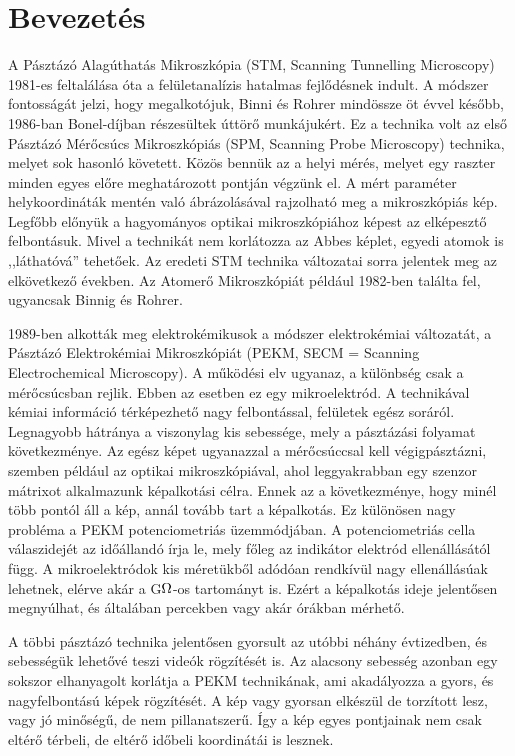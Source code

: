 \section{Bevezetés}
A Pásztázó Alagúthatás Mikroszkópia (STM, Scanning Tunnelling Microscopy) 1981-es feltalálása óta a felületanalízis hatalmas fejlődésnek indult.
A módszer fontosságát jelzi, hogy megalkotójuk, Binni és Rohrer mindössze öt évvel később, 1986-ban Bonel-díjban részesültek úttörő munkájukért. 
Ez a technika volt az első Pásztázó Mérőcsúcs Mikroszkópiás (SPM, Scanning Probe Microscopy) technika, melyet sok hasonló követett.
Közös bennük az a helyi mérés, melyet egy raszter minden egyes előre meghatározott pontján végzünk el.
A mért paraméter helykoordináták mentén való ábrázolásával rajzolható meg a mikroszkópiás kép.
Legfőbb előnyük a hagyományos optikai mikroszkópiához képest az elképesztő felbontásuk.
Mivel a technikát nem korlátozza az Abbes képlet, egyedi atomok is ,,láthatóvá'' tehetőek.
Az eredeti STM technika változatai sorra jelentek meg az elkövetkező években.
Az Atomerő Mikroszkópiát például 1982-ben találta fel, ugyancsak Binnig és Rohrer.

1989-ben alkották meg elektrokémikusok a módszer elektrokémiai változatát, a Pásztázó Elektrokémiai Mikroszkópiát (PEKM, SECM = Scanning Electrochemical Microscopy).
A működési elv ugyanaz, a különbség csak a mérőcsúcsban rejlik.
Ebben az esetben ez egy mikroelektród.
A technikával kémiai információ térképezhető nagy felbontással, felületek egész soráról.
Legnagyobb hátránya a viszonylag kis sebessége, mely a pásztázási folyamat következménye.
Az egész képet ugyanazzal a mérőcsúccsal kell végigpásztázni, szemben például az optikai mikroszkópiával, ahol leggyakrabban egy szenzor mátrixot alkalmazunk képalkotási célra.
Ennek az a következménye, hogy minél több pontól áll a kép, annál tovább tart a képalkotás.
Ez különösen nagy probléma a PEKM potenciometriás üzemmódjában.
A potenciometriás cella válaszidejét az időállandó írja le, mely főleg az indikátor elektród ellenállásától függ.
A mikroelektródok kis méretükből adódóan rendkívül nagy ellenállásúak lehetnek, elérve akár a G$\ohm$-os tartományt is.
Ezért a képalkotás ideje jelentősen megnyúlhat, és általában percekben vagy akár órákban mérhető.

A többi pásztázó technika jelentősen gyorsult az utóbbi néhány évtizedben, és sebességük lehetővé teszi videók rögzítését is.
Az alacsony sebesség azonban egy sokszor elhanyagolt korlátja a PEKM technikának, ami akadályozza a gyors, és nagyfelbontású képek rögzítését.
A kép vagy gyorsan elkészül de torzított lesz, vagy jó minőségű, de nem pillanatszerű.
Így a kép egyes pontjainak nem csak eltérő térbeli, de eltérő időbeli koordinátái is lesznek.

